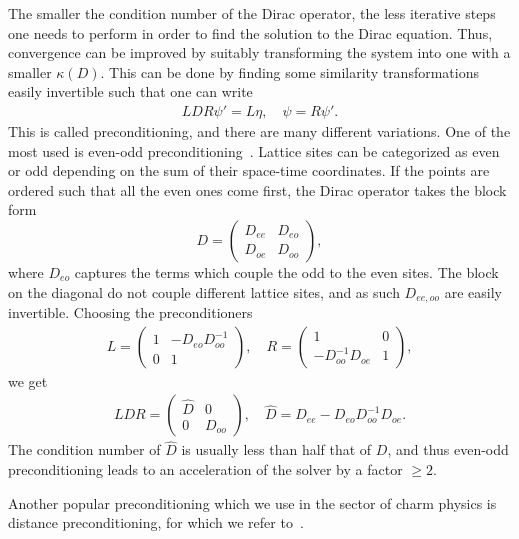 The smaller the condition number of the Dirac operator, the less iterative steps one needs to perform in order to find the solution to the Dirac equation. Thus, convergence can be improved by suitably transforming the system into one with a smaller $\kappa(D)$. This can be done by finding some similarity transformations easily invertible such that one can write
\begin{gather}
LDR\psi'=L\eta, \quad \psi=R\psi'.
\end{gather}
This is called preconditioning, and there are many different variations. One of the most used is even-odd preconditioning~\citep{DEGRAND1988161}. Lattice sites can be categorized as even or odd depending on the sum of their space-time coordinates. If the points are ordered such that all the even ones come first, the Dirac operator takes the block form
\begin{equation}
D=\begin{pmatrix}
D_{ee} & D_{eo} \\ 
D_{oe} & D_{oo}
\end{pmatrix},
\end{equation}
where $D_{eo}$ captures the terms which couple the odd to the even sites. The block on the diagonal do not couple different lattice sites, and as such $D_{ee,oo}$ are easily invertible. Choosing the preconditioners
\begin{gather}
L=\begin{pmatrix}
1 & -D_{eo}D_{oo}^{-1} \\ 
0 & 1
\end{pmatrix}, \quad 
R=\begin{pmatrix}
1 & 0 \\ 
-D_{oo}^{-1}D_{oe} &  1
\end{pmatrix},
\end{gather}
we get
\begin{gather}
LDR=\begin{pmatrix}
\hat{D} & 0 \\ 
0 & D_{oo}
\end{pmatrix}, \quad
\hat{D}=D_{ee}-D_{eo}D_{oo}^{-1}D_{oe}.
\end{gather}
The condition number of $\hat{D}$ is usually less than half that of $D$, and thus even-odd preconditioning leads to an acceleration of the solver by a factor $\geq2$.

Another popular preconditioning which we use in the sector of charm physics is distance preconditioning, for which we refer to~\citep{deDivitiis:2010ya}. 




